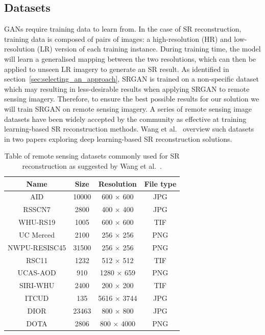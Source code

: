 \subsection{Datasets}
GANs require training data to learn from. In the case of SR reconstruction, training data is composed of pairs of images: a high-resolution (HR) and low-resolution (LR) version of each training instance. During training time, the model will learn a generalised mapping between the two resolutions, which can then be applied to unseen LR imagery to generate an SR result. As identified in section~\ref{sec:selecting_an_approach}, SRGAN is trained on a non-specific dataset which may resulting in less-desirable results when applying SRGAN to remote sensing imagery. Therefore, to ensure the best possible results for our solution we will train SRGAN on remote sensing imagery. A series of remote sensing image datasets have been widely accepted by the community as effective at training learning-based SR reconstruction methods. Wang et al.~\cite{remoteSensingDeepLearningReview, remoteSensingGANsReview} overview such datasets in two papers exploring deep learning-based SR reconstruction solutions.
\begin{table}
    \centering
    \begin{tabular}{cccc}
        \toprule
        \textbf{Name} & \textbf{Size} & \textbf{Resolution} & \textbf{File type} \\
        \midrule
        AID & 10000 & 600 $\times$ 600 & JPG \\
        RSSCN7 & 2800 & 400 $\times$ 400 & JPG \\
        WHU-RS19 & 1005 & 600 $\times$ 600 & TIF \\
        UC Merced & 2100 & 256 $\times$ 256 & PNG \\
        NWPU-RESISC45 & 31500 & 256 $\times$ 256 & PNG \\
        RSC11 & 1232 & 512 $\times$ 512 & TIF \\
        UCAS-AOD & 910 & 1280 $\times$ 659 & PNG \\
        SIRI-WHU & 2400 & 200 $\times$ 200 & TIF \\
        ITCUD & 135 & 5616 $\times$ 3744 & JPG \\
        DIOR & 23463 & 800 $\times$ 800 & JPG \\
        DOTA & 2806 & 800 $\times$ 4000 & PNG \\
        \bottomrule
    \end{tabular}
    \caption{Table of remote sensing datasets commonly used for SR reconstruction as suggested by Wang et al.~\cite{remoteSensingDeepLearningReview,remoteSensingGANsReview}.}
    \label{table:datasets_table}
\end{table}

